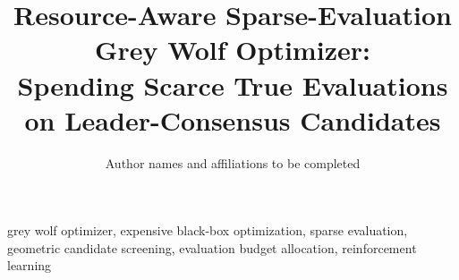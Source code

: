 \documentclass[journal,10pt]{IEEEtran}
\begin{document}
\title{Resource-Aware Sparse-Evaluation Grey Wolf Optimizer:\\
Spending Scarce True Evaluations on Leader-Consensus Candidates}
\author{Author names and affiliations to be completed}
\maketitle
\begin{abstract}

\end{abstract}
\begin{IEEEkeywords}
grey wolf optimizer, expensive black-box optimization, sparse evaluation,
geometric candidate screening, evaluation budget allocation, reinforcement learning
\end{IEEEkeywords}








\end{document}
